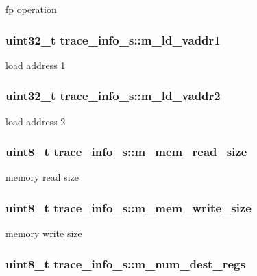 \label{structtrace__info__s_ac504bfb834947ca4af12b22a70a16231}
fp operation \hypertarget{structtrace__info__s_a92bca84db2f2475b588ea2537f0e2584}{
\subsubsection[{m\_\-ld\_\-vaddr1}]{\setlength{\rightskip}{0pt plus 5cm}uint32\_\-t {\bf trace\_\-info\_\-s::m\_\-ld\_\-vaddr1}}}
\label{structtrace__info__s_a92bca84db2f2475b588ea2537f0e2584}
load address 1 \hypertarget{structtrace__info__s_a25c287a7d0f2e661da6540dca5361e74}{
\subsubsection[{m\_\-ld\_\-vaddr2}]{\setlength{\rightskip}{0pt plus 5cm}uint32\_\-t {\bf trace\_\-info\_\-s::m\_\-ld\_\-vaddr2}}}
\label{structtrace__info__s_a25c287a7d0f2e661da6540dca5361e74}
load address 2 \hypertarget{structtrace__info__s_a1556d15a3ac7249b4a520c182bc6c028}{
\subsubsection[{m\_\-mem\_\-read\_\-size}]{\setlength{\rightskip}{0pt plus 5cm}uint8\_\-t {\bf trace\_\-info\_\-s::m\_\-mem\_\-read\_\-size}}}
\label{structtrace__info__s_a1556d15a3ac7249b4a520c182bc6c028}
memory read size \hypertarget{structtrace__info__s_a4702c91bebc10a9f68a537e46de02909}{
\subsubsection[{m\_\-mem\_\-write\_\-size}]{\setlength{\rightskip}{0pt plus 5cm}uint8\_\-t {\bf trace\_\-info\_\-s::m\_\-mem\_\-write\_\-size}}}
\label{structtrace__info__s_a4702c91bebc10a9f68a537e46de02909}
memory write size \hypertarget{structtrace__info__s_a2d250544eb2d81da6b644b33101ef76e}{
\subsubsection[{m\_\-num\_\-dest\_\-regs}]{\setlength{\rightskip}{0pt plus 5cm}uint8\_\-t {\bf trace\_\-info\_\-s::m\_\-num\_\-dest\_\-regs}}}
